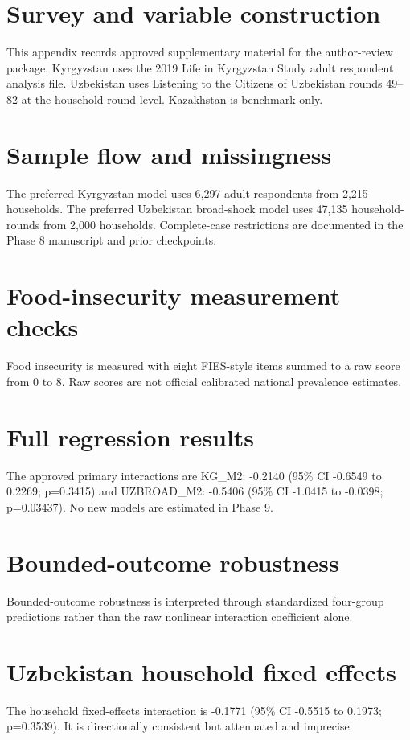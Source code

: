 \appendix
\section{Survey and variable construction}
This appendix records approved supplementary material for the author-review package. Kyrgyzstan uses the 2019 Life in Kyrgyzstan Study adult respondent analysis file. Uzbekistan uses Listening to the Citizens of Uzbekistan rounds 49--82 at the household-round level. Kazakhstan is benchmark only.

\section{Sample flow and missingness}
The preferred Kyrgyzstan model uses 6,297 adult respondents from 2,215 households. The preferred Uzbekistan broad-shock model uses 47,135 household-rounds from 2,000 households. Complete-case restrictions are documented in the Phase 8 manuscript and prior checkpoints.

\section{Food-insecurity measurement checks}
Food insecurity is measured with eight FIES-style items summed to a raw score from 0 to 8. Raw scores are not official calibrated national prevalence estimates.

\section{Full regression results}
The approved primary interactions are KG\_M2: -0.2140 (95\% CI -0.6549 to 0.2269; p=0.3415) and UZBROAD\_M2: -0.5406 (95\% CI -1.0415 to -0.0398; p=0.03437). No new models are estimated in Phase 9.

\section{Bounded-outcome robustness}
Bounded-outcome robustness is interpreted through standardized four-group predictions rather than the raw nonlinear interaction coefficient alone.

\section{Uzbekistan household fixed effects}
The household fixed-effects interaction is -0.1771 (95\% CI -0.5515 to 0.1973; p=0.3539). It is directionally consistent but attenuated and imprecise.

